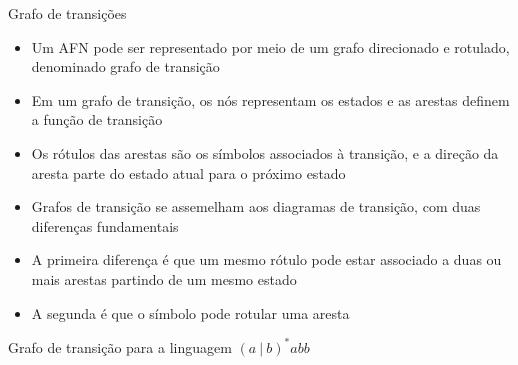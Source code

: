 \begin{frame}[fragile]{Grafo de transições}

    \begin{itemize}
        \item Um AFN pode ser representado por meio de um grafo direcionado e rotulado, denominado grafo de transição
        \pause

        \item Em um grafo de transição, os nós representam os estados e as arestas definem a função de transição
        \pause

        \item Os rótulos das arestas são os símbolos associados à transição, e a direção da aresta parte do estado atual para o próximo estado
        \pause

        \item Grafos de transição se assemelham aos diagramas de transição, com duas diferenças fundamentais
        \pause

        \item A primeira diferença é que um mesmo rótulo pode estar associado a duas ou mais arestas partindo de um mesmo estado
        \pause

        \item A segunda é que o símbolo  pode rotular uma aresta
    \end{itemize}

\end{frame}

\begin{frame}[fragile]{Grafo de transição para a linguagem $(a\ |\ b)^*abb$}

    \begin{figure}
        \centering

    \end{figure}
\end{frame}


